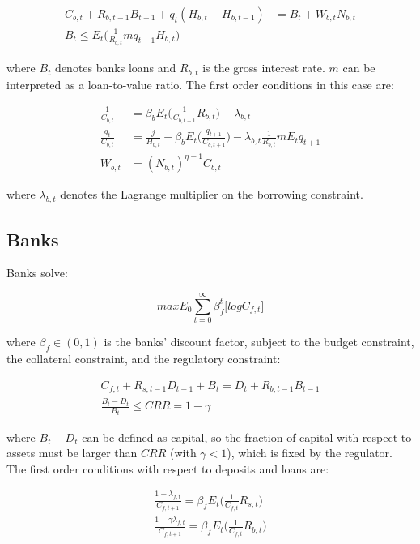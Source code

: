 \documentclass[final,3p,times,twocolumn]{elsarticle}
\begin{document}
\begin{align}
C_{b,t} + R_{b,t-1}B_{t-1} + q_t(H_{b,t} - H_{b,t-1}) &= B_t + W_{b,t}N_{b,t} \\
B_t \le E_t \Bigg( \frac{1}{R_{b,t}}m q_{t+1}H_{b,t} \Bigg)
\end{align}

where $B_t$ denotes banks loans and $R_{b,t}$ is the gross interest rate. $m$ can be interpreted as a loan-to-value ratio. The first order conditions in this case are:

\begin{align}
\frac{1}{C_{b,t}} &= \beta_b E_t\Bigg( \frac{1}{C_{b,t+1}}R_{b,t} \Bigg) + \lambda_{b,t} \\
 \frac{q_t}{C_{b,t}} &= \frac{j}{H_{b,t}} + \beta_b E_t \Bigg( \frac{q_{t+1}}{C_{b,t+1}} \Bigg) - \lambda_{b,t} \frac{1}{R_{b,t}}m E_t q_{t+1} \\
W_{b,t} &= (N_{b,t})^{\eta-1} C_{b,t} 
\end{align}

where $\lambda_{b,t}$ denotes the Lagrange multiplier on the borrowing constraint.

 \subsection{Banks}

Banks solve:

$$max \displaystyle E_0 \sum_{t=0}^{\infty}\beta_f^t \bigg[ log C_{f,t} \bigg] $$

where $\beta_f \in (0,1)$ is the banks' discount factor, subject to the budget constraint, the collateral constraint, and the regulatory constraint:

\begin{align} \label{eq:1} 
C_{f,t} + R_{s,t-1}D_{t-1} + B_t = D_t + R_{b,t-1}B_{t-1} \\ 
\frac{B_t-D_t}{B_t} \leq CRR = 1-\gamma
\end{align}

where $B_t-D_t$ can be defined as capital, so the fraction of capital with respect to assets must be larger than $CRR$ (with $\gamma<1$), which is fixed by the regulator. The first order conditions with respect to deposits and loans are:

\begin{align}
 \frac{1-\lambda_{f,t}}{C_{f,t+1}} = \beta_f E_t \Bigg( \frac{1}{C_{f,t}}R_{s,t}\Bigg) \\
 \frac{1-\gamma\lambda_{f,t}}{C_{f,t+1}} = \beta_f E_t \Bigg( \frac{1}{C_{f,t}}R_{b,t}\Bigg)
\end{align}
\end{document}

